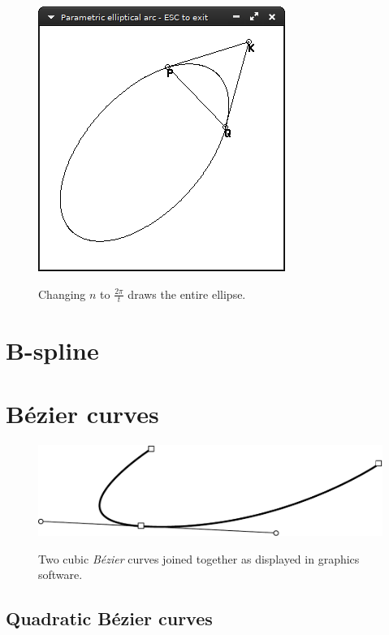 \documentclass[12pt,openany,a4,usenames,dvipsnames]{book}
\DeclareRobustCommand{\Caption}[1]{\par%
  \vspace{1em}
  {\noindent{}#1}}
\begin{document}
\begin{figure}[H]
  \centering
  \includegraphics[keepaspectratio]{figures/parellarc2.png}
  \Caption{Changing $n$ to $\frac{2\pi{}}{t}$ draws the entire ellipse.}
\end{figure}
\chapter{B-spline}
\skelpar%
\skelpar%
\chapter{Bézier curves}
\begin{figure}[H]
\centering
\includegraphics[width=\textwidth,keepaspectratio]{figures/bezier_path.pdf}\par
{\noindent{}Two cubic \emph{Bézier} curves joined together as displayed in graphics software.}
\end{figure}
\skelpar%
\skelpar%
\section{Quadratic Bézier curves}
\end{document}
